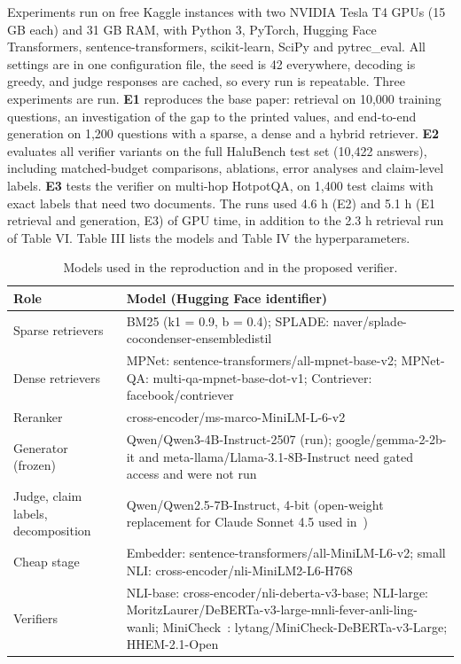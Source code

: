 \documentclass[conference]{IEEEtran}
\begin{document}
Experiments run on free Kaggle instances with two NVIDIA Tesla T4 GPUs (15 GB each) and 31 GB RAM, with Python 3, PyTorch, Hugging Face Transformers, sentence-transformers, scikit-learn, SciPy and pytrec\_eval. All settings are in one configuration file, the seed is 42 everywhere, decoding is greedy, and judge responses are cached, so every run is repeatable. Three experiments are run. \textbf{E1} reproduces the base paper: retrieval on 10,000 training questions, an investigation of the gap to the printed values, and end-to-end generation on 1,200 questions with a sparse, a dense and a hybrid retriever. \textbf{E2} evaluates all verifier variants on the full HaluBench test set (10,422 answers), including matched-budget comparisons, ablations, error analyses and claim-level labels. \textbf{E3} tests the verifier on multi-hop HotpotQA, on 1,400 test claims with exact labels that need two documents. The runs used 4.6 h (E2) and 5.1 h (E1 retrieval and generation, E3) of GPU time, in addition to the 2.3 h retrieval run of Table VI. Table III lists the models and Table IV the hyperparameters.

\begin{table}[t]
\centering
\caption{Models used in the reproduction and in the proposed verifier.}
\label{tab:t3}
\footnotesize
\setlength{\tabcolsep}{3pt}
\renewcommand{\arraystretch}{1.12}
\begin{tabularx}{\columnwidth}{>{\raggedright\arraybackslash\hsize=0.591\hsize}X>{\raggedright\arraybackslash\hsize=1.409\hsize}X}
\toprule
\textbf{Role} & \textbf{Model (Hugging Face identifier)} \\
\midrule
Sparse retrievers & BM25 (k1 = 0.9, b = 0.4); SPLADE: naver/splade-cocondenser-ensembledistil \\
Dense retrievers & MPNet: sentence-transformers/all-mpnet-base-v2; MPNet-QA: multi-qa-mpnet-base-dot-v1; Contriever: facebook/contriever \\
Reranker & cross-encoder/ms-marco-MiniLM-L-6-v2 \\
Generator (frozen) & Qwen/Qwen3-4B-Instruct-2507 (run); google/gemma-2-2b-it and meta-llama/Llama-3.1-8B-Instruct need gated access and were not run \\
Judge, claim labels, decomposition & Qwen/Qwen2.5-7B-Instruct, 4-bit (open-weight replacement for Claude Sonnet 4.5 used in~\cite{mala_ml}) \\
Cheap stage & Embedder: sentence-transformers/all-MiniLM-L6-v2; small NLI: cross-encoder/nli-MiniLM2-L6-H768 \\
Verifiers & NLI-base: cross-encoder/nli-deberta-v3-base; NLI-large: MoritzLaurer/DeBERTa-v3-large-mnli-fever-anli-ling-wanli; MiniCheck~\cite{tang_minicheck}: lytang/MiniCheck-DeBERTa-v3-Large; HHEM-2.1-Open~\cite{vectara_hhem} \\
\bottomrule
\end{tabularx}
\end{table}
\end{document}
